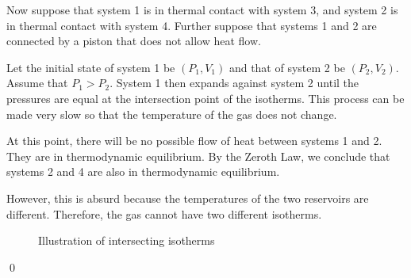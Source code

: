 \documentclass[12pt]{article}
\begin{document}
Now suppose that system 1 is in thermal contact with system 3, and system 2 is in thermal contact with system 4. Further suppose that systems 1 and 2 are connected by a piston that does not allow heat flow.

Let the initial state of system 1 be $(P_{1}, V_{1})$ and that of system 2 be $(P_{2}, V_{2})$. Assume that $P_{1} > P_{2}$. System 1 then expands against system 2 until the pressures are equal at the intersection point of the isotherms. This process can be made very slow so that the temperature of the gas does not change.

At this point, there will be no possible flow of heat between systems 1 and 2. They are in thermodynamic equilibrium. By the Zeroth Law, we conclude that systems 2 and 4 are also in thermodynamic equilibrium.

However, this is absurd because the temperatures of the two reservoirs are different. Therefore, the gas cannot have two different isotherms.

\begin{figure}[h]
    \centering
    
    \caption{Illustration of intersecting isotherms}
\end{figure}
\qed
\end{document}
